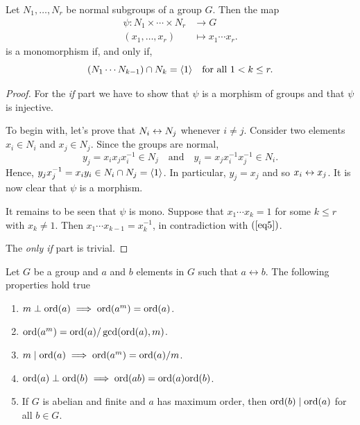 \begin{thm}\label{direct-product}
    Let $N_1,\dots,N_r$ be normal subgroups of a group $G$. Then the map
    \begin{align*}
        \psi\colon N_1\times\cdots\times N_r&\to G\\
        (x_1,\dots,x_r)&\mapsto x_1\cdots x_r.
    \end{align*}
    is a monomorphism if, and only if,
    \begin{equation}\label{eq5}
        (N_1\cdots N_{k-1})\cap N_k=\langle1\rangle\quad\textrm{\upshape for all }1<k\le r.  
    \end{equation}
\end{thm}


\begin{proof} 

For the \textit{if\/} part we have to show that $\psi$ is a morphism of groups and that $\psi$ is injective.

To begin with, let's prove that $N_i\mathrel\leftrightarrow N_j$ whenever $i\ne j$. Consider two elements $x_i\in N_i$ and $x_j\in N_j$. Since the groups are normal,
$$
    y_j=x_ix_jx_i^{-1}\in N_j\quad\textrm{and}\quad y_i=x_jx_i^{-1}x_j^{-1}\in N_i.
$$
Hence, $y_jx_j^{-1}=x_iy_i\in N_i\cap N_j=\langle1\rangle$. In particular, $y_j=x_j$ and so $x_i\mathrel\leftrightarrow x_j$. It is now clear that $\psi$ is a morphism.

It remains to be seen that $\psi$ is mono. Suppose that $x_1\cdots x_k=1$ for some $k\le r$ with $x_k\ne1$. Then $x_1\cdots x_{k-1}=x_k^{-1}$, in contradiction with $(\ref{eq5})$.

The \textit{only if\/} part is trivial.  \end{proof}

\begin{lem}\label{order-properties}
    Let\/ $G$ be a group and\/ $a$ and\/ $b$ elements in\/ $G$ such that $a\leftrightarrow b$. The following properties hold true
    \begin{enumerate}[\upshape a)]
        \item $m\perp{\rm ord}(a)\implies{\rm ord}(a^m)={\rm ord}(a)$.
        \item ${\rm ord}(a^m)={\rm ord}(a)/\gcd({\rm ord}(a),m)$.
        \item $m\mid{\rm ord}(a)\implies{\rm ord}(a^m)={\rm ord}(a)/m$.
        \item ${\rm ord}(a)\perp{\rm ord}(b)\implies{\rm ord}(ab)={\rm ord}(a){\rm ord}(b)$.
        \item If\/ $G$ is abelian and finite and $a$ has maximum order, then\/ ${\rm ord}(b)\mid{\rm ord}(a)$ for all\/ $b\in G$.
    \end{enumerate}
\end{lem}

